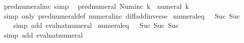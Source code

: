 \begin{isabellebody}
\endisatagproof
{\isafoldproof}%
%
\isadelimproof
\isanewline
%
\endisadelimproof
\isanewline
{}\isamarkupfalse%
\ pred{\isacharunderscore}{\kern0pt}numeral{\isacharunderscore}{\kern0pt}inc\ {\isacharbrackleft}{\kern0pt}simp{\isacharbrackright}{\kern0pt}{\isacharcolon}{\kern0pt}\isanewline
\ \ {\isachardoublequoteopen}pred{\isacharunderscore}{\kern0pt}numeral\ {\isacharparenleft}{\kern0pt}Num{\isachardot}{\kern0pt}inc\ k{\isacharparenright}{\kern0pt}\ {\isacharequal}{\kern0pt}\ numeral\ k{\isachardoublequoteclose}\isanewline
%
\isadelimproof
\ \ %
\endisadelimproof
%
\isatagproof
{}\isamarkupfalse%
\ {\isacharparenleft}{\kern0pt}simp\ only{\isacharcolon}{\kern0pt}\ pred{\isacharunderscore}{\kern0pt}numeral{\isacharunderscore}{\kern0pt}def\ numeral{\isacharunderscore}{\kern0pt}inc\ diff{\isacharunderscore}{\kern0pt}add{\isacharunderscore}{\kern0pt}inverse{}{\isacharparenright}{\kern0pt}%
\endisatagproof
{\isafoldproof}%
%
\isadelimproof
\isanewline
%
\endisadelimproof
\isanewline
{}\isamarkupfalse%
\ numeral{\isacharunderscore}{\kern0pt}{}{\isacharunderscore}{\kern0pt}eq{\isacharunderscore}{\kern0pt}{}{\isacharcolon}{\kern0pt}\ {\isachardoublequoteopen}{}\ {\isacharequal}{\kern0pt}\ Suc\ {\isacharparenleft}{\kern0pt}Suc\ {}{\isacharparenright}{\kern0pt}{\isachardoublequoteclose}\isanewline
%
\isadelimproof
\ \ %
\endisadelimproof
%
\isatagproof
{}\isamarkupfalse%
\ {\isacharparenleft}{\kern0pt}simp\ add{\isacharcolon}{\kern0pt}\ eval{\isacharunderscore}{\kern0pt}nat{\isacharunderscore}{\kern0pt}numeral{\isacharparenright}{\kern0pt}%
\endisatagproof
{\isafoldproof}%
%
\isadelimproof
\isanewline
%
\endisadelimproof
\isanewline
{}\isamarkupfalse%
\ numeral{\isacharunderscore}{\kern0pt}{}{\isacharunderscore}{\kern0pt}eq{\isacharunderscore}{\kern0pt}{}{\isacharcolon}{\kern0pt}\ {\isachardoublequoteopen}{}\ {\isacharequal}{\kern0pt}\ Suc\ {\isacharparenleft}{\kern0pt}Suc\ {\isacharparenleft}{\kern0pt}Suc\ {}{\isacharparenright}{\kern0pt}{\isacharparenright}{\kern0pt}{\isachardoublequoteclose}\isanewline
%
\isadelimproof
\ \ %
\endisadelimproof
%
\isatagproof
{}\isamarkupfalse%
\ {\isacharparenleft}{\kern0pt}simp\ add{\isacharcolon}{\kern0pt}\ eval{\isacharunderscore}{\kern0pt}nat{\isacharunderscore}{\kern0pt}numeral{\isacharparenright}{\kern0pt}%
\endisatagproof
{\isafoldproof}%
%
\isadelimproof
\isanewline
%
\endisadelimproof
\isanewline
{}\isamarkupfalse%

\end{isabellebody}
